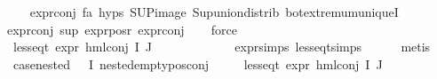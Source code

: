 \begin{isabellebody}
\isanewline
\ \ \isamarkupfalse%
\ expr{\isacharunderscore}{\kern0pt}{}{\isacharunderscore}{\kern0pt}conj\ fa{\isacharunderscore}{\kern0pt}{\isasympsi}\ {\isachardoublequoteopen}{}{\isachardot}{\kern0pt}hyps{\isachardoublequoteclose}\ SUP{\isacharunderscore}{\kern0pt}image\ Sup{\isacharunderscore}{\kern0pt}union{\isacharunderscore}{\kern0pt}distrib\ bot{\isachardot}{\kern0pt}extremum{\isacharunderscore}{\kern0pt}uniqueI\isanewline
expr{\isacharunderscore}{\kern0pt}{}{\isacharunderscore}{\kern0pt}conj\ sup{\isacharunderscore}{\kern0pt}{\isasymphi}\ expr{\isacharunderscore}{\kern0pt}{}{\isacharunderscore}{\kern0pt}pos{\isacharunderscore}{\kern0pt}r\ expr{\isacharunderscore}{\kern0pt}{}{\isacharunderscore}{\kern0pt}conj\isanewline
\ \ \isamarkupfalse%
\ force{\isacharplus}{\kern0pt}\isanewline
\isanewline
\ \ \isamarkupfalse%
\ \isamarkupfalse%
\ {\isachardoublequoteopen}less{\isacharunderscore}{\kern0pt}eq{\isacharunderscore}{\kern0pt}t\ {\isacharparenleft}{\kern0pt}expr\ {\isacharparenleft}{\kern0pt}hml{\isacharunderscore}{\kern0pt}conj\ I\ J\ {\isasymPhi}{\isacharparenright}{\kern0pt}{\isacharparenright}{\kern0pt}\ {\isacharparenleft}{\kern0pt}{}{\isacharcomma}{\kern0pt}\ {\isasyminfinity}{\isacharcomma}{\kern0pt}\ {}{\isacharcomma}{\kern0pt}\ {}{\isacharcomma}{\kern0pt}\ {}{\isacharcomma}{\kern0pt}\ {}{\isacharparenright}{\kern0pt}{\isachardoublequoteclose}\isanewline
\ \ \ \ \isamarkupfalse%
\ expr{\isachardot}{\kern0pt}simps\ less{\isacharunderscore}{\kern0pt}eq{\isacharunderscore}{\kern0pt}t{\isachardot}{\kern0pt}simps\isanewline
\ \ \ \ \isamarkupfalse%
\ metis\isanewline
{}\isamarkupfalse%
\isanewline
\isanewline
\ \ \isamarkupfalse%
\ case{\isacharunderscore}{\kern0pt}nested{\isacharcolon}{\kern0pt}\ {\isachardoublequoteopen}{\isacharparenleft}{\kern0pt}{\isasymforall}{\isasympsi}{\isasymin}{\isasymPhi}\ {\isacharbackquote}{\kern0pt}\ I{\isachardot}{\kern0pt}\ nested{\isacharunderscore}{\kern0pt}empty{\isacharunderscore}{\kern0pt}pos{\isacharunderscore}{\kern0pt}conj\ {\isasympsi}{\isacharparenright}{\kern0pt}\ {\isasymlongrightarrow}\ \isanewline
\ \ less{\isacharunderscore}{\kern0pt}eq{\isacharunderscore}{\kern0pt}t\ {\isacharparenleft}{\kern0pt}expr\ {\isacharparenleft}{\kern0pt}hml{\isacharunderscore}{\kern0pt}conj\ I\ J\ {\isasymPhi}{\isacharparenright}{\kern0pt}{\isacharparenright}{\kern0pt}\ {\isacharparenleft}{\kern0pt}{}{\isacharcomma}{\kern0pt}\ {\isasyminfinity}{\isacharcomma}{\kern0pt}\ {}{\isacharcomma}{\kern0pt}\ {}{\isacharcomma}{\kern0pt}\ {}{\isacharcomma}{\kern0pt}\ {}{\isacharparenright}{\kern0pt}{\isachardoublequoteclose}\isanewline

\end{isabellebody}
